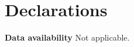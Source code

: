 \documentclass[10pt]{article}
\begin{document}
\section*{Declarations}

\textbf{Data availability} Not applicable.



\end{document}
